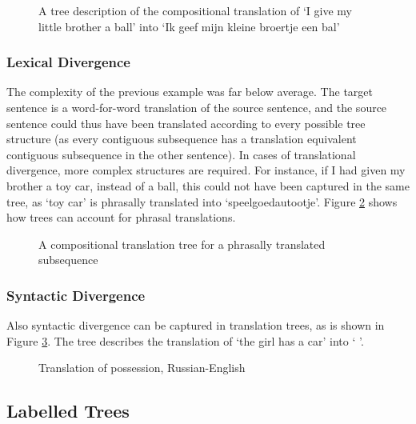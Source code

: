 \begin{figure}[!ht]

\caption{A tree description of the compositional translation of `I give my little brother a ball' into `Ik geef mijn kleine broertje een bal'}\label{fig:transtrees}
\end{figure}

\subsubsection{Lexical Divergence}

The complexity of the previous example was far below average. The target sentence is a word-for-word translation of the source sentence, and the source sentence could thus have been translated according to every possible tree structure (as every contiguous subsequence has a translation equivalent contiguous subsequence in the other sentence). In cases of translational divergence, more complex structures are required. For instance, if I had given my brother a toy car, instead of a ball, this could not have been captured in the same tree, as `toy car' is phrasally translated into `speelgoedautootje'. Figure \ref{fig:phrasal} shows how trees can account for phrasal translations.

\begin{figure}[!ht]
\centering

\caption{A compositional translation tree for a phrasally translated subsequence}\label{fig:phrasal}
\end{figure}

\subsubsection{Syntactic Divergence}

Also syntactic divergence can be captured in translation trees, as is shown in Figure \ref{fig:russian}. The tree describes the translation of `the girl has a car' into `    '.

\begin{figure}[!ht]
\centering

\caption{Translation of possession, Russian-English}\label{fig:russian}
\end{figure}

\subsection{Labelled Trees}

